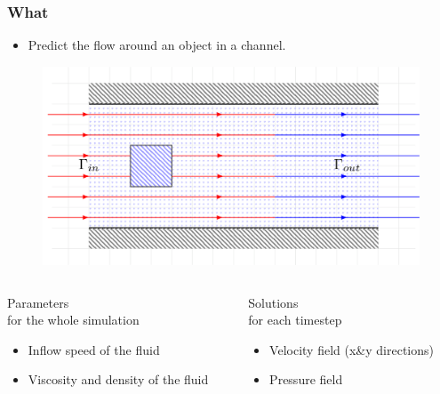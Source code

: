 \documentclass[18pt]{beamer}
\begin{document}
\begin{frame}[t]
  \frametitle{What}
  \begin{itemize}
  \item Predict the flow around an object in a channel.
  \end{itemize}

  \begin{figure}[htb]
    \includegraphics[scale=0.14]{images/channel/flow_2}
  \end{figure}

  \vspace{-1cm}
  
  \begin{columns}[t]
    \begin{column}{0.5\textwidth}
      \begin{center}
        \Large{Parameters}\\
        \small{for the whole simulation}
      \end{center}
      \begin{itemize}
      \item Inflow speed of the fluid
      \item Viscosity and density of the fluid
      \end{itemize}
      
    \end{column}
    \begin{column}{0.5\textwidth}
      \begin{center}
        \Large{Solutions}\\
        \small{for each timestep}
      \end{center}

      \begin{itemize}
      \item Velocity field (x\&y directions)
      \item Pressure field
      \end{itemize}
      
    \end{column}
  \end{columns}

\end{frame}
\end{document}
